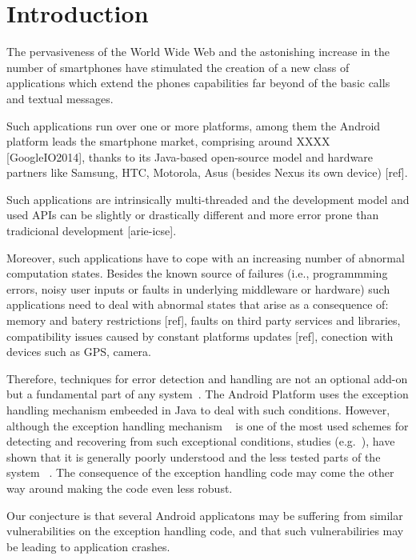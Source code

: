 \documentclass[conference]{IEEEtran}
\begin{document}

\section{Introduction}

The pervasiveness of the World Wide Web and the astonishing increase in the
number of smartphones have stimulated the creation of a new class of
applications which extend the phones capabilities far beyond of the basic calls
and textual messages. 

Such applications run over one or more platforms, among them the Android platform
leads the smartphone market, comprising around XXXX [GoogleIO2014], thanks to its
Java-based open-source model and hardware partners like Samsung, HTC, Motorola, Asus 
(besides Nexus its own device) [ref]. 

Such applications are intrinsically multi-threaded and the development model and used APIs 
can be  slightly or drastically different and more error prone than tradicional development [arie-icse]. 

Moreover, such applications have to cope with an increasing number of abnormal
computation states. Besides the known source of failures (i.e., programmming errors, noisy 
user inputs or faults in underlying middleware or hardware) such applications need to deal with abnormal states that 
 arise as a consequence of:  memory and batery restrictions [ref], faults on third party services and libraries, 
compatibility issues caused by constant platforms updates [ref], conection with devices such as GPS, camera.

Therefore, techniques for error detection and handling are not  an optional add-on but a fundamental part of any system~\cite{bruntink2006discovering}. The Android Platform uses the exception handling mechanism embeeded
 in Java to deal with such conditions. However, although the exception handling mechanism
~\cite{goodenough1975exception} is one of the most used schemes for
detecting and recovering from such exceptional conditions, studies (e.g.~\cite{miller1997issues,Robil00,shah2010understanding, garcia2007extracting,garcia2001comparative,cabral2007exception,coelho2011unveiling}),
have shown that it is generally poorly understood and the less tested parts of the system ~\cite{coelho2011unveiling}.
The consequence of the exception handling code may come the other way around making the code even less robust.

Our conjecture is that several Android applicatons may be suffering from similar vulnerabilities on the exception
handling code, and that such vulnerabiliries may be leading to application crashes.
\end{document}
